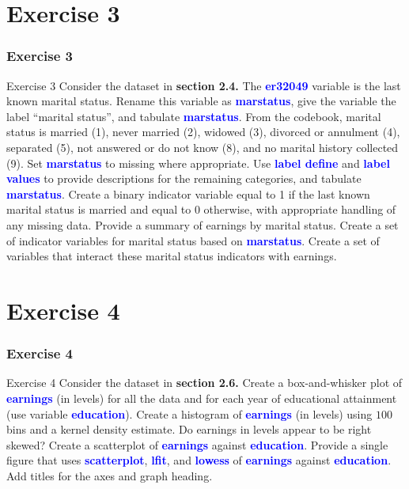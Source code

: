 \documentclass[11pt, aspectratio=169]{beamer}
\begin{document}
	\section{Exercise 3}
		\begin{frame}
			\frametitle{Exercise 3}
			\begin{block}{Exercise 3}
				Consider the dataset in \textcolor{red!50}{\textbf{section 2.4.}} The \textcolor{blue}{\textbf{er32049}} 
				variable is the last known marital status. Rename this variable as \textcolor{blue}{\textbf{marstatus}}, give the
				variable the label “marital status”, and tabulate \textcolor{blue}{\textbf{marstatus}}. From the
				codebook, marital status is married (1), never married (2), widowed
				(3), divorced or annulment (4), separated (5), not answered or do not
				know (8), and no marital history collected (9). Set \textcolor{blue}{\textbf{marstatus}} to
				missing where appropriate. Use \textcolor{blue}{\textbf{label define}} and \textcolor{blue}{\textbf{label values}} to
				provide descriptions for the remaining categories, and tabulate
				\textcolor{blue}{\textbf{marstatus}}. Create a binary indicator variable equal to 1 if the last
				known marital status is married and equal to 0 otherwise, with
				appropriate handling of any missing data. Provide a summary of
				earnings by marital status. Create a set of indicator variables for
				marital status based on \textcolor{blue}{\textbf{marstatus}}. Create a set of variables that
				interact these marital status indicators with earnings.
			\end{block}
		\end{frame}
	\section{Exercise 4}
		\begin{frame}
			\frametitle{Exercise 4}
			\begin{block}{Exercise 4}
				Consider the dataset in \textcolor{red!50}{\textbf{section 2.6.}} Create a box-and-whisker plot of
				\textcolor{blue}{\textbf{earnings}} (in levels) for all the data and for each year of educational
				attainment (use variable \textcolor{blue}{\textbf{education}}). Create a histogram of \textcolor{blue}{\textbf{earnings}}
				(in levels) using $100$ bins and a kernel density estimate. Do earnings in
				levels appear to be right skewed? Create a scatterplot of \textcolor{blue}{\textbf{earnings}}
				against \textcolor{blue}{\textbf{education}}. Provide a single figure that uses \textcolor{blue}{\textbf{scatterplot}},
				\textcolor{blue}{\textbf{lfit}}, and \textcolor{blue}{\textbf{lowess}} of \textcolor{blue}{\textbf{earnings}} against \textcolor{blue}{\textbf{education}}. Add titles for the
				axes and graph heading.
			\end{block}
		\end{frame}
\end{document}
